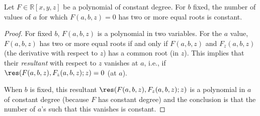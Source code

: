 \begin{lemma}
Let $F \in \mathbb{R}[x,y,z]$ be a polynomial of constant degree.
For \(b\) fixed, the number of values of $a$
for which \(F(a,b,z)=0\) has two  or more equal roots is constant.
\end{lemma}
\begin{proof}
For fixed \(b\), \(F(a,b,z)\) is a polynomial in two variables. For the $a$ value,
\(F(a,b,z)\) has two or more equal roots if and only if \(F(a,b,z)\) and
\(F_z(a,b,z)\)
(the derivative with respect to \(z\)) has a common root (in \(z\)). This implies
that their \emph{resultant} with respect to \(z\) vanishes at \(a\), i.e., if
\(\res(F(a,b,z),F_z(a,b,z);z)=0\) (at $a$).

When $b$ is fixed, this resultant \(\res(F(a,b,z), F_z(a,b,z);z)\) is a polynomial
in $a$ of constant degree (because \(F\) has constant degree) and the conclusion is
that the number of \(a\)'s such that this vanishes is constant.
\end{proof}

